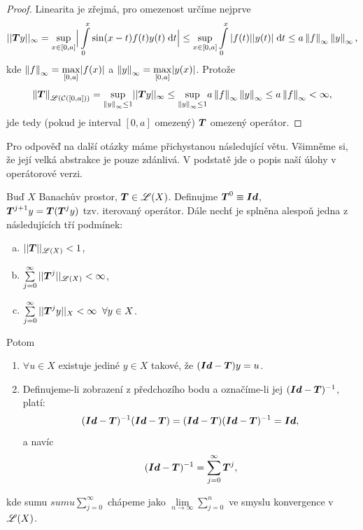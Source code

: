 \begin{proof}
Linearita je zřejmá, pro omezenost určíme nejprve
\begin{equation}
    || \boldsymbol{T} y||_\infty = \underset{x\in[0,a]}{\sup}\Big|\int\limits_0^x\sin(x-t)f(t)y(t)\;\mathrm{d}t\Big|\leq \underset{x\in[0,a]}{\sup}\int\limits_0^x|f(t)||y(t)|\;\mathrm{d}t\leq a\left\lVert f\right\rVert_\infty\left\lVert y\right\rVert_\infty,
\end{equation}
kde $\left\lVert f\right\rVert_\infty = \underset{[0,a]}{\max} |f(x)|$ a $\left\lVert y\right\rVert_\infty = \underset{[0,a]}{\max} |y(x)|$. Protože  
\begin{equation}
    \left\lVert\boldsymbol{T}\right\rVert_{\mathscr{L} \left( \mathcal{C}\left([0,a]\right) \right) } = \underset{\left\lVert y\right\rVert_\infty\leq1}{\sup}|| \boldsymbol{T} y||_\infty\leq \underset{\left\lVert y\right\rVert_\infty\leq1}{\sup} a \left\lVert f\right\rVert_\infty \left\lVert y\right\rVert_\infty\leq a \left\lVert f\right\rVert_\infty<\infty,
    \label{eq:omezeniOperatoru}
\end{equation}
jde tedy (pokud je interval $[0,a]$ omezený) $\boldsymbol{T}$ omezený operátor.
\end{proof}

Pro odpověď na další otázky máme přichystanou následující větu. Všimněme si, že její velká abstrakce je pouze zdánlivá. V podstatě jde o popis naší úlohy v operátorové verzi.


\begin{theorem}
\label{theorem:str14}
Buď $X$ Banachův prostor, $ \boldsymbol{T} \in\mathscr{L}(X)$. Definujme $ \boldsymbol{T} ^0\equiv \boldsymbol{Id}$,\\ $ \boldsymbol{T} ^{j+1}y= \boldsymbol{T} ( \boldsymbol{T} ^jy)$ tzv. iterovaný operátor. Dále nechť je splněna alespoň jedna z následujících tří podmínek:
\begin{enumerate}[a)]
    \item $|| \boldsymbol{T} ||_{\mathscr{L}(X)}<1$,
    \item $\sum\limits_{j=0}^\infty|| \boldsymbol{T} ^j||_{\mathscr{L}(X)}<\infty$,
    \item $\sum\limits_{j=0}^\infty|| \boldsymbol{T} ^jy||_X<\infty \;\;\forall y\in X$.
\end{enumerate}
Potom
\begin{enumerate}
    \item $\forall u \in X$ existuje jediné $y\in X$ takové, že $(\boldsymbol{Id}- \boldsymbol{T} )y=u$.
    \item Definujeme-li zobrazení  z předchozího bodu a označíme-li jej $(\boldsymbol{Id}- \boldsymbol{T} )^{-1}$, platí:
    \begin{equation}
        (\boldsymbol{Id}- \boldsymbol{T} )^{-1}(\boldsymbol{Id}- \boldsymbol{T} ) = (\boldsymbol{Id}- \boldsymbol{T} )(\boldsymbol{Id}- \boldsymbol{T} )^{-1}=\boldsymbol{Id},
    \end{equation}
    a navíc
    \begin{equation}
        (\boldsymbol{Id}- \boldsymbol{T} )^{-1}=\sum\limits_{j=0}^\infty  \boldsymbol{T} ^j,
        \label{eq:Neumann}
    \end{equation}
\end{enumerate}
kde sumu $sumu \sum\limits_{j=0}^\infty$ chápeme jako $\lim\limits_{n\rightarrow\infty} \sum\limits_{j=0}^{n}$ ve smyslu konvergence v $\mathscr{L}(X)$.
\end{theorem} 

